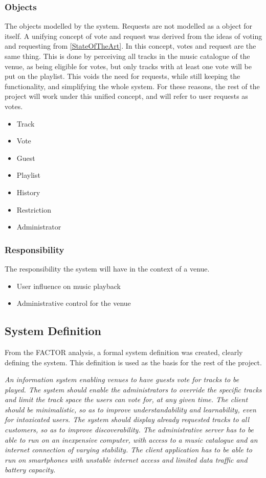 \subsubsection{Objects}
\label{FACTORObjects}
The objects modelled by the system.
Requests are not modelled as a object for itself. A unifying concept of vote and request was derived from the ideas of voting and requesting from \cref{StateOfTheArt}. In this concept, votes and request are the same thing. This is done by perceiving all tracks in the music catalogue of the venue, as being eligible for votes, but only tracks with at least one vote will be put on the playlist. This voids the need for requests, while still keeping the functionality, and simplifying the whole system. For these reasons, the rest of the project will work under this unified concept, and will refer to user requests as votes.
\begin{itemize}
  \item Track
  \item Vote
  \item Guest
  \item Playlist
  \item History
  \item Restriction
  \item Administrator
\end{itemize}

\subsubsection{Responsibility}
The responsibility the system will have in the context of a venue.
\begin{itemize}
  \item User influence on music playback
  \item Administrative control for the venue
\end{itemize}

\subsection{System Definition}\label{sub:systemDefinition}
From the FACTOR analysis, a formal system definition was created,
clearly defining the system. This definition is used as the basis for
the rest of the project.

\begin{center}
\textit{An information system enabling venues to have guests vote for tracks to be played. The system should enable the administrators to override the specific tracks and limit the track space the users can vote for, at any given time. The client should be minimalistic, so as to improve understandability and learnability, even for intoxicated users. The system should display already requested tracks to all customers, so as to improve discoverability.
The administrative server has to be able to run on an inexpensive computer, with access to a music catalogue and an internet connection of varying stability. The client application has to be able to run on smartphones with unstable internet access and limited data traffic and battery capacity.}
\end{center}
